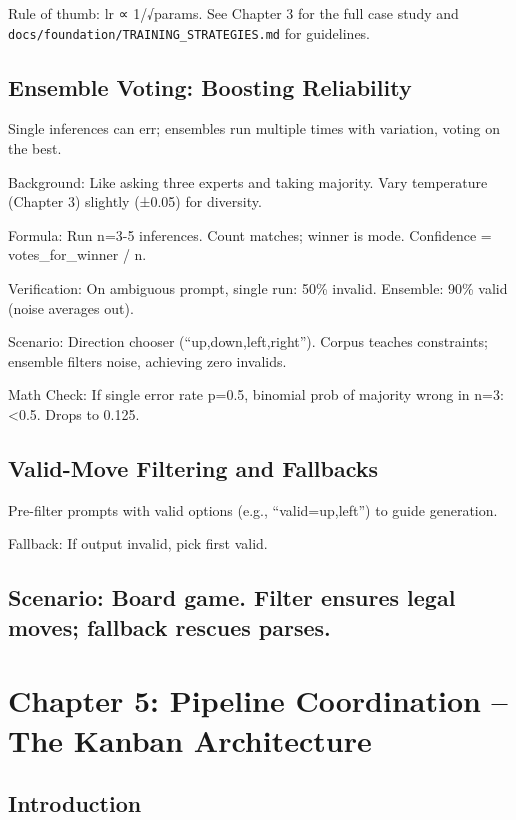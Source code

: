 \documentclass[
]{article}
\begin{document}
Rule of thumb: lr ∝ 1/√params. See Chapter 3 for the full case study and
\texttt{docs/foundation/TRAINING\_STRATEGIES.md} for guidelines.

\subsection{Ensemble Voting: Boosting
Reliability}\label{ensemble-voting-boosting-reliability}

Single inferences can err; ensembles run multiple times with variation,
voting on the best.

Background: Like asking three experts and taking majority. Vary
temperature (Chapter 3) slightly (±0.05) for diversity.

Formula: Run n=3-5 inferences. Count matches; winner is mode. Confidence
= votes\_for\_winner / n.

Verification: On ambiguous prompt, single run: 50\% invalid. Ensemble:
90\% valid (noise averages out).

Scenario: Direction chooser (``up,down,left,right''). Corpus teaches
constraints; ensemble filters noise, achieving zero invalids.

Math Check: If single error rate p=0.5, binomial prob of majority wrong
in n=3: \textless0.5. Drops to 0.125.

\subsection{Valid-Move Filtering and
Fallbacks}\label{valid-move-filtering-and-fallbacks}

Pre-filter prompts with valid options (e.g., ``valid=up,left'') to guide
generation.

Fallback: If output invalid, pick first valid.

\subsection{Scenario: Board game. Filter ensures legal moves; fallback
rescues
parses.}\label{scenario-board-game.-filter-ensures-legal-moves-fallback-rescues-parses.}

\section{Chapter 5: Pipeline Coordination -- The Kanban
Architecture}\label{chapter-5-pipeline-coordination-the-kanban-architecture}

\subsection{Introduction}\label{introduction-4}
\end{document}
